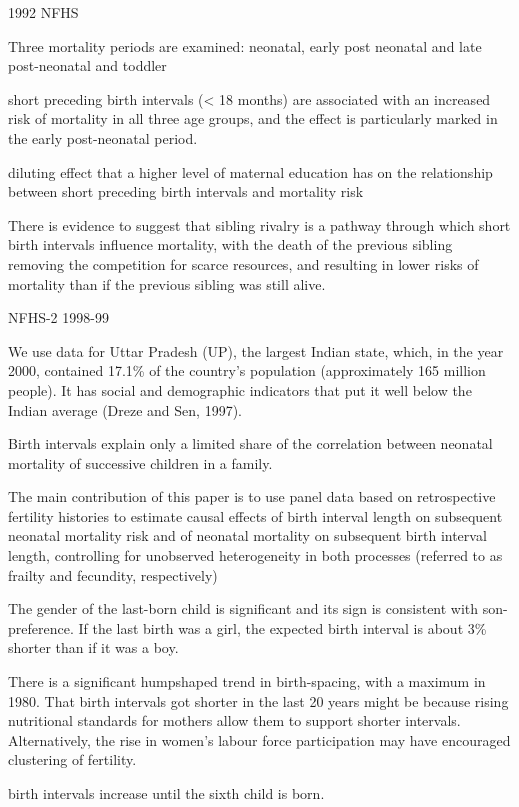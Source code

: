 1992 NFHS

Three mortality periods are examined: neonatal, early post neonatal and
late post-neonatal and toddler 

short preceding birth intervals (< 18 months) are associated with an
increased risk of mortality in all three age groups, and the effect is
particularly marked in the early post-neonatal period.

diluting effect that a higher level of maternal education has on the
relationship between short preceding birth intervals and mortality risk

There is evidence to suggest that sibling rivalry is a pathway through
which short birth intervals inﬂuence mortality, with the death of the
previous sibling removing the competition for scarce resources, and
resulting in lower risks of mortality than if the previous sibling was
still alive.


\citep{Bhalotra2008}

NFHS-2 1998-99

We use data for Uttar Pradesh (UP), the largest Indian state, which, in
the year 2000, contained 17.1\% of the country’s population
(approximately 165 million people). It has social and demographic
indicators that put it well below the Indian average (Dreze and Sen,
1997).

Birth intervals explain only a limited share of the correlation between
neonatal mortality of successive children in a family.

The main contribution of this paper is to use panel data based on
retrospective fertility histories to estimate causal effects of birth
interval length on subsequent neonatal mortality risk and of neonatal
mortality on subsequent birth interval length, controlling for
unobserved heterogeneity in both processes (referred to as frailty and
fecundity, respectively)


The gender of the last-born child is signiﬁcant and its sign is
consistent with son-preference. If the last birth was a girl, the
expected birth interval is about 3\% shorter than if it was a boy.

There is a signiﬁcant humpshaped trend in birth-spacing, with a maximum
in 1980. That birth intervals got shorter in the last 20 years might be
because rising nutritional standards for mothers allow them to support
shorter intervals. Alternatively, the rise in women’s labour force
participation may have encouraged clustering of fertility.

birth intervals increase until the sixth child is born.

